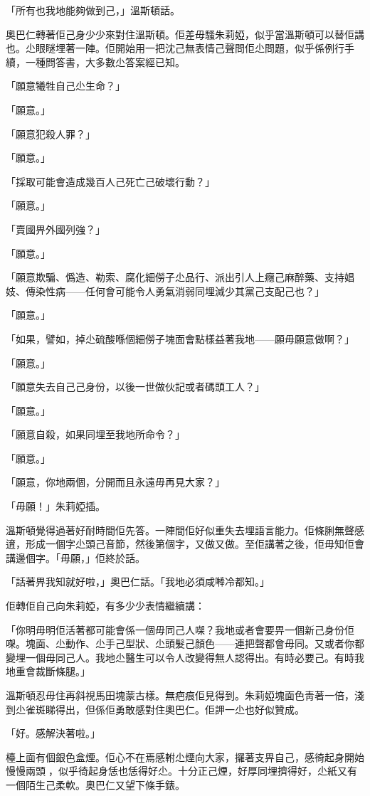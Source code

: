「所有也我地能夠做到己，」溫斯頓話。

奧巴仁轉著佢己身少少來對住溫斯頓。佢差毋騷朱莉婭，似乎當溫斯頓可以替佢講也。尐眼瞇埋著一陣。佢開始用一把沈己無表情己聲問佢尐問題，似乎係例行手續，一種問答書，大多數尐答案經已知。

「願意犧牲自己尐生命？」

「願意。」

「願意犯殺人罪？」

「願意。」

「採取可能會造成幾百人己死亡己破壞行動？」

「願意。」

「賣國畀外國列強？」

「願意。」

「願意欺騙、僞造、勒索、腐化細僗子尐品行、派出引人上癮己麻醉藥、支持娼妓、傳染性病——任何會可能令人勇氣消弱同埋減少其黨己支配己也？」

「願意。」

「如果，譬如，掉尐硫酸喺個細僗子塊面會點樣益著我地——願毋願意做啊？」

「願意。」

「願意失去自己己身份，以後一世做伙記或者碼頭工人？」

「願意。」

「願意自殺，如果同埋至我地所命令？」

「願意。」

「願意，你地兩個，分開而且永遠毋再見大家？」

「毋願！」朱莉婭插。

溫斯頓覺得過著好耐時間佢先答。一陣間佢好似重失去埋語言能力。佢條脷無聲感逳，形成一個字尐頭己音節，然後第個字，又做又做。至佢講著之後，佢毋知佢會講邊個字。「毋願，」佢終於話。

「話著畀我知就好啦，」奧巴仁話。「我地必須咸𠾴冷都知。」

佢轉佢自己向朱莉婭，有多少少表情繼續講：

「你明毋明佢活著都可能會係一個毋同己人㗎？我地或者會要畀一個新己身份佢㗎。塊面、尐動作、尐手己型狀、尐頭髮己顏色——連把聲都會毋同。又或者你都變埋一個毋同己人。我地尐醫生可以令人改變得無人認得出。有時必要己。有時我地重會裁斷條腿。」

溫斯頓忍毋住再斜視馬田塊蒙古樣。無疤痕佢見得到。朱莉婭塊面色靑著一倍，淺到尐雀斑睇得出，但係佢勇敢感對住奧巴仁。佢䛅一尐也好似贊成。

「好。感解決著啦。」

檯上面有個銀色盒煙。佢心不在焉感軵尐煙向大家，攞著支畀自己，感徛起身開始慢慢兩頭𨆐，似乎徛起身恁也恁得好尐。十分正己煙，好厚同埋擠得好，尐紙又有一個陌生己柔軟。奧巴仁又望下條手錶。

